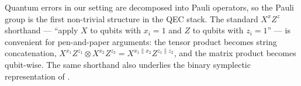 %
%

Quantum errors in our setting are decomposed into Pauli operators, so the Pauli
group is the first non-trivial structure in the QEC stack. The standard $X^x
Z^z$ shorthand --- ``apply $X$ to qubits with $x_i = 1$ and $Z$ to qubits with
$z_i = 1$'' --- is convenient for pen-and-paper arguments: the tensor product
becomes string concatenation, $X^{x_1}Z^{z_1} \otimes X^{x_2}Z^{z_2} = X^{x_1 \|
x_2}Z^{z_1 \| z_2}$, and the matrix product becomes qubit-wise. The same
shorthand also underlies the binary symplectic representation of
.


